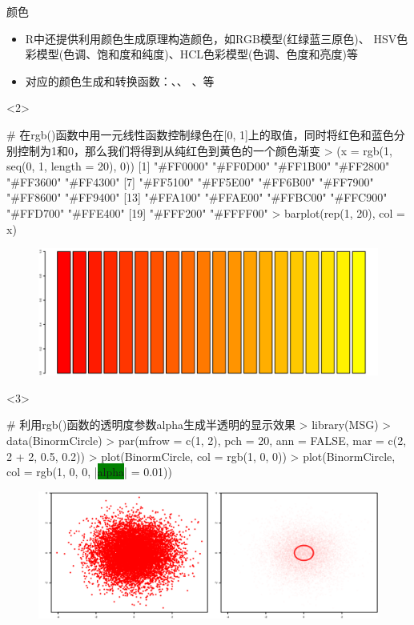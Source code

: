 \documentclass{beamerthemeMono}
\begin{document}
\begin{frame}[t,fragile]{\subsecname}{颜色}
\begin{itemize}
\item R中还提供利用颜色生成原理构造颜色，如RGB模型(红绿蓝三原色)、
          HSV色彩模型(色调、饱和度和纯度)、HCL色彩模型(色调、色度和亮度)等
\item 对应的颜色生成和转换函数：、、
      、等
\end{itemize}

\begin{overlayarea}{\textwidth}{\textheight}
\begin{onlyenv}<2>
\begin{rcode}
# 在rgb()函数中用一元线性函数控制绿色在[0, 1]上的取值，同时将红色和蓝色分别控制为1和0，那么我们将得到从纯红色到黄色的一个颜色渐变
> (x = rgb(1, seq(0, 1, length = 20), 0))
 [1] "#FF0000" "#FF0D00" "#FF1B00" "#FF2800" "#FF3600" "#FF4300" 
 [7] "#FF5100" "#FF5E00" "#FF6B00" "#FF7900" "#FF8600" "#FF9400" 
[13] "#FFA100" "#FFAE00" "#FFBC00" "#FFC900" "#FFD700" "#FFE400" 
[19] "#FFF200" "#FFFF00"
> barplot(rep(1, 20), col = x)
\end{rcode}
\begin{figure}\centering
  \includegraphics[width=0.8\columnwidth]{rgb-bar.png}
\end{figure}
\end{onlyenv}

\begin{onlyenv}<3>
\begin{rcode}
# 利用rgb()函数的透明度参数alpha生成半透明的显示效果
> library(MSG)
> data(BinormCircle)
> par(mfrow = c(1, 2), pch = 20, ann = FALSE, mar = c(2, 2 + 2, 0.5, 0.2))
> plot(BinormCircle, col = rgb(1, 0, 0))
> plot(BinormCircle, col = rgb(1, 0, 0, |\colorbox{green}{alpha}| = 0.01))
\end{rcode}
\begin{figure}\centering
  \includegraphics[width=0.9\columnwidth]{color-example.png}
\end{figure}
\end{onlyenv}
\end{overlayarea}  
\end{frame}
\end{document}
